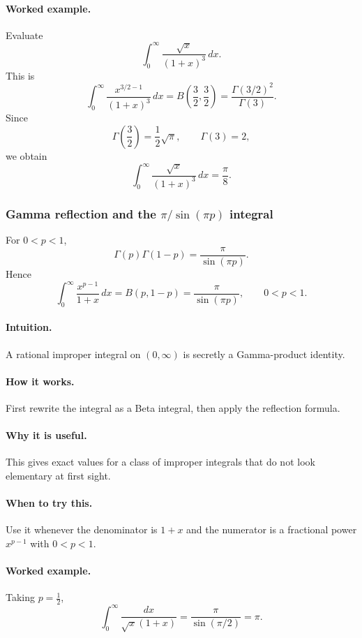\documentclass[12pt]{article}
\begin{document}
\paragraph{Worked example.}
Evaluate
\[
\int_0^\infty \frac{\sqrt{x}}{(1+x)^3}\,dx.
\]
This is
\[
\int_0^\infty \frac{x^{3/2-1}}{(1+x)^3}\,dx
=B\!\left(\frac32,\frac32\right)
=\frac{\Gamma(3/2)^2}{\Gamma(3)}.
\]
Since
\[
\Gamma\!\left(\frac32\right)=\frac12\sqrt{\pi},
\qquad
\Gamma(3)=2,
\]
we obtain
\[
\int_0^\infty \frac{\sqrt{x}}{(1+x)^3}\,dx=\frac{\pi}{8}.
\]

\newpage
\subsubsection{Gamma reflection and the \(\pi/\sin(\pi p)\) integral}
For \(0<p<1\),
\[
\Gamma(p)\Gamma(1-p)=\frac{\pi}{\sin(\pi p)}.
\]
Hence
\[
\int_0^\infty \frac{x^{p-1}}{1+x}\,dx
=B(p,1-p)=\frac{\pi}{\sin(\pi p)},
\qquad 0<p<1.
\]

\paragraph{Intuition.}
A rational improper integral on \((0,\infty)\) is secretly a Gamma-product identity.

\paragraph{How it works.}
First rewrite the integral as a Beta integral, then apply the reflection formula.

\paragraph{Why it is useful.}
This gives exact values for a class of improper integrals that do not look elementary at first sight.

\paragraph{When to try this.}
Use it whenever the denominator is \(1+x\) and the numerator is a fractional power \(x^{p-1}\) with \(0<p<1\).

\paragraph{Worked example.}
Taking \(p=\tfrac12\),
\[
\int_0^\infty \frac{dx}{\sqrt{x}(1+x)}
=\frac{\pi}{\sin(\pi/2)}=\pi.
\]
\end{document}

